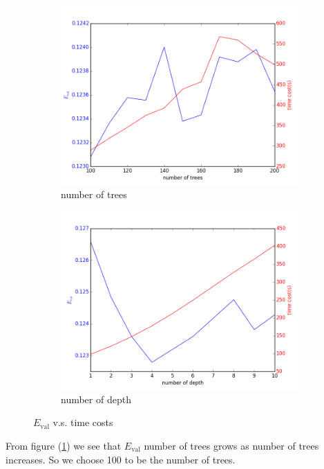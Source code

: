 \documentclass[12pt]{article}
\begin{document}
\begin{figure}[H]
	\centering
	\begin{subfigure}{.4\textwidth}
		\centering
		\includegraphics[width=1.0\linewidth]{GB-1.png}
		\caption{number of trees}
		\label{gb-1}
	\end{subfigure}
	\begin{subfigure}{.4\textwidth}
		\centering
		\includegraphics[width=1.0\linewidth]{GB-2.png}
		\caption{number of depth}
		\label{gb-2}
	\end{subfigure}
	\caption{$E_{\text{val}}$ v.s. time costs}
\end{figure}
From figure (\ref{gb-1}) we see that $E_{\text{val}}$ number of trees grows as number of trees increases. So we choose 100 to be the number of trees.
\end{document}
